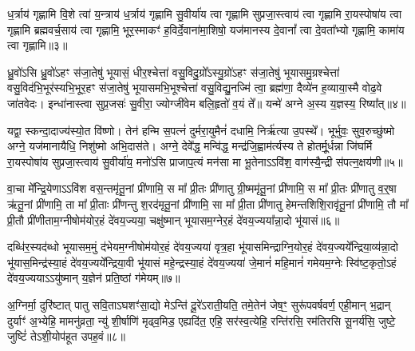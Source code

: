 ध॒र्त्राय॑ गृह्णामि वि॒शे त्वा॑ य॒न्त्राय॑ ध॒र्त्राय॑ गृह्णामि सु॒वीर्या॑य त्वा गृह्णामि सुप्रजा॒स्त्वाय॑ त्वा गृह्णामि रा॒यस्पोषा॑य त्वा गृह्णामि ब्रह्मवर्च॒साय॑ त्वा गृह्णामि॒ भूर॒स्माकꣳ॑ ह॒विर्दे॒वाना॑मा॒शिषो॒ यज॑मानस्य दे॒वानां᳚ त्वा दे॒वता᳚भ्यो गृह्णामि॒ कामा॑य त्वा गृह्णामि॥३॥

{\anuvakamend[{स॒त्यायु॒रोज॑से य॒न्त्राय॒ त्रय॑स्त्रिꣳशच्च॥१॥}]}

ध्रु॒वो॑\-ऽसि ध्रु॒वो॑\-ऽहꣳ स॑जा॒तेषु॑ भूयासं॒ धीर॒श्चेत्ता॑ वसु॒विदु॒ग्रो᳚\-ऽस्यु॒ग्रो॑\-ऽहꣳ स॑जा॒तेषु॑ भूयासमु॒ग्रश्चेत्ता॑ वसु॒विद॑भि॒भूर॑स्यभि॒भूर॒हꣳ स॑जा॒तेषु॑ भूयासमभि॒भूश्चेत्ता॑ वसु॒विद्यु॒नज्मि॑ त्वा॒ ब्रह्म॑णा॒ दैव्ये॑न ह॒व्याया॒स्मै वोढ॒वे जा॑तवेदः। इन्धा॑नास्त्वा सुप्र॒जसः॑ सु॒वीरा॒ ज्योग्जी॑वेम बलि॒हृतो॑ व॒यं ते᳚॥ यन्मे॑ अग्ने अ॒स्य य॒ज्ञस्य॒ रिष्या᳚त्॥४॥

यद्वा॒ स्कन्दा॒दाज्य॑स्यो॒त वि॑ष्णो। तेन॑ हन्मि स॒पत्नं॑ दुर्मरा॒युमैनं॑ दधामि॒ निर्\mbox{}ऋ॑त्या उ॒पस्थे᳚। भूर्भुवः॒ सुव॒रुच्छु॑ष्मो अग्ने॒ यज॑मानायैधि॒ निशु॑ष्मो अभि॒दास॑ते। अग्ने॒ देवे᳚द्ध॒ मन्वि॑द्ध॒ मन्द्र॑जि॒ह्वाम॑र्त्यस्य ते होतर्मू॒र्धन्ना जि॑घर्मि रा॒यस्पोषा॑य सुप्रजा॒स्त्वाय॑ सु॒वीर्या॑य॒ मनो॑\-ऽसि प्राजाप॒त्यं मन॑सा मा भू॒तेना\-ऽ\-ऽवि॑श॒ वाग॑स्यै॒न्द्री स॑पत्न॒क्षय॑णी॥५॥

वा॒चा मे᳚न्द्रि॒येणा\-ऽ\-ऽवि॑श वस॒न्तमृ॑तू॒नां प्री॑णामि॒ स मा᳚ प्री॒तः प्री॑णातु ग्री॒ष्ममृ॑तू॒नां प्री॑णामि॒ स मा᳚ प्री॒तः प्री॑णातु व॒र्॒\mbox{}षा ऋ॑तू॒नां प्री॑णामि॒ ता मा᳚ प्री॒ताः प्री॑णन्तु श॒रद॑मृतू॒नां प्री॑णामि॒ सा मा᳚ प्री॒ता प्री॑णातु हेमन्तशिशि॒रावृ॑तू॒नां प्री॑णामि॒ तौ मा᳚ प्री॒तौ प्री॑णीताम॒ग्नीषोम॑योर॒हं दे॑वय॒ज्यया॒ चक्षु॑ष्मान् भूयासम॒ग्नेर॒हं दे॑वय॒ज्यया᳚न्ना॒दो भू॑यासं॥६॥

दब्धि॑र॒स्यद॑ब्धो भूयासम॒मुं द॑भेयम॒ग्नीषोम॑योर॒हं दे॑वय॒ज्यया॑ वृत्र॒हा भू॑यासमिन्द्राग्नि॒योर॒हं दे॑वय॒ज्यये᳚न्द्रिया॒व्य॑न्ना॒दो भू॑यास॒मिन्द्र॑स्या॒हं दे॑वय॒ज्यये᳚न्द्रिया॒वी भू॑यासं महे॒न्द्रस्या॒हं दे॑वय॒ज्यया॑ जे॒मानं॑ महि॒मानं॑ गमेयम॒ग्नेः स्वि॑ष्ट॒कृतो॒\-ऽहं दे॑वय॒ज्यया\-ऽ\-ऽयु॑ष्मान् य॒ज्ञेन॑ प्रति॒ष्ठां ग॑मेयम्॥७॥

{\anuvakamend[{रिष्या᳚त् सपत्न॒क्षय॑ण्यन्ना॒दो भू॑यास॒ꣳ॒ षट्त्रिꣳ॑शच्च॥२॥}]}

अ॒ग्निर्मा॒ दुरि॑ष्टात् पातु सवि॒ता\-ऽघशꣳ॑सा॒द्यो मे\-ऽन्ति॑ दू॒रे॑\-ऽराती॒यति॒ तमे॒तेन॑ जेष॒ꣳ॒ सुरू॑पवर्\mbox{}षवर्ण॒ एही॒मान् भ॒द्रान् दुर्याꣳ॑ अ॒भ्येहि॒ मामनु॑व्रता॒ न्यु॑ शी॒र्\mbox{}षाणि॑ मृढ्व॒मिड॒ एह्यदि॑त॒ एहि॒ सर॑स्व॒त्येहि॒ रन्ति॑रसि॒ रम॑तिरसि सू॒नर्य॑सि॒ जुष्टे॒ जुष्टिं॑ ते\-ऽशी॒योप॑हूत उपह॒वं॥८॥

